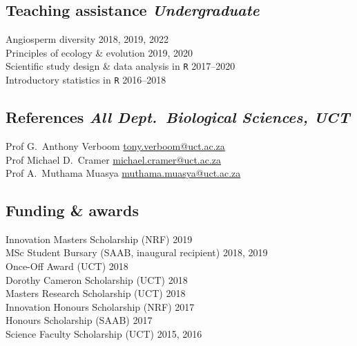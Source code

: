 \documentclass[10pt]{article}
\begin{document}
\begin{multicols}{2}
\subsection*{Teaching assistance %
                                \hfill {\small \textmd{\textit{Undergraduate}}}}

Angiosperm diversity                         \hfill {\small 2018, 2019, 2022} \\
Principles of ecology \& evolution           \hfill {\small       2019, 2020} \\
Scientific study design \& data analysis in \texttt{R}
                                             \hfill {\small       2017--2020} \\
Introductory statistics in \texttt{R}        \hfill {\small       2016--2018}

\subsection*{References %
           \hfill {\small \textmd{\textit{All Dept.~Biological Sciences, UCT}}}}

Prof G.~Anthony Verboom
      \hfill     \href{mailto:tony.verboom@uct.ac.za}{tony.verboom@uct.ac.za} \\
Prof Michael D.~Cramer
      \hfill \href{mailto:michael.cramer@uct.ac.za}{michael.cramer@uct.ac.za} \\
Prof A.~Muthama Muasya
      \hfill \href{mailto:muthama.muasya@uct.ac.za}{muthama.muasya@uct.ac.za} \\

\subsection*{Funding \& awards} %

Innovation Masters Scholarship {\small  (NRF)}     \hfill {\small       2019} \\
MSc Student Bursary            {\small (SAAB, inaugural recipient)}
                                                   \hfill {\small 2018, 2019} \\
Once-Off Award                 {\small  (UCT)}     \hfill {\small       2018} \\
Dorothy Cameron Scholarship    {\small  (UCT)}     \hfill {\small       2018} \\
Masters Research Scholarship   {\small  (UCT)}     \hfill {\small       2018} \\
Innovation Honours Scholarship {\small  (NRF)}     \hfill {\small       2017} \\
Honours Scholarship            {\small (SAAB)}     \hfill {\small       2017} \\
Science Faculty Scholarship    {\small  (UCT)}     \hfill {\small 2015, 2016}


\end{multicols}
\end{document}
